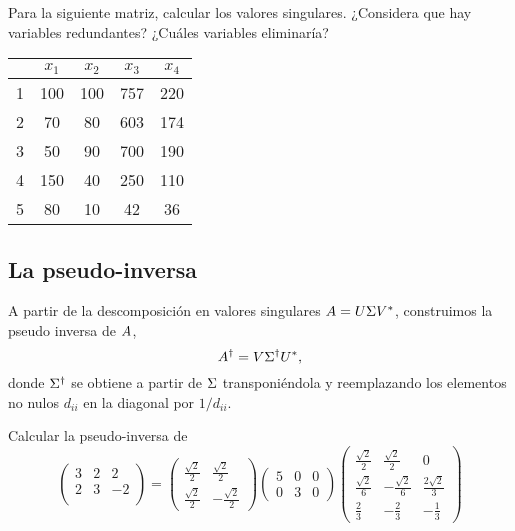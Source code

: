 \begin{ejercicio}
Para la siguiente matriz, calcular los valores singulares. ¿Considera que hay variables redundantes? ¿Cuáles variables eliminaría?
\begin{center}
 \begin{tabular}{||c c c c c||}
 \hline
  & $x_1$ & $x_2$ & $x_3$ & $x_4$ \\ [0.5ex]
 \hline\hline
 1 & 100 & 100 & 757  & 220\\
 \hline
 2 & 70 & 80 & 603 & 174 \\
 \hline
 3 & 50 & 90 & 700 & 190 \\
 \hline
 4 & 150 & 40 & 250 & 110 \\
 \hline
 5 & 80 & 10 & 42 & 36 \\ [1ex]
 \hline
\end{tabular}
\end{center}
\end{ejercicio}

\subsection{La pseudo-inversa}

A partir de la descomposición en valores singulares $\Ab = \Ub \Sigma \Vb^*$,
construimos la pseudo inversa de $\Ab$,
$$
\Ab^\dagger = \Vb \Sigmab^\dagger \Ub^*,
$$
donde $\Sigmab^\dagger$ se obtiene a partir de $\Sigmab$ transponiéndola y
reemplazando los elementos no nulos $d_{ii}$ en la diagonal por
$1 / d_{ii}$.

\begin{ejercicio} Calcular la pseudo-inversa de
$$
\begin{pmatrix}
3 & 2 & 2 \\
2 & 3 & -2 \\
\end{pmatrix} = \begin{pmatrix}
\frac{\sqrt2}{2} & \frac{\sqrt2}{2} \\
\frac{\sqrt2}{2} & -\frac{\sqrt2}{2}
\end{pmatrix} \begin{pmatrix}
5 & 0 & 0 \\
0 & 3 & 0
\end{pmatrix}
\begin{pmatrix}
\frac{\sqrt2}{2} & \frac{\sqrt2}{2} & 0 \\
\frac{\sqrt2}{6} & -\frac{\sqrt2}{6} & \frac{2\sqrt2}{3} \\
\frac23 & -\frac23 & -\frac13
\end{pmatrix}
$$
\end{ejercicio}

